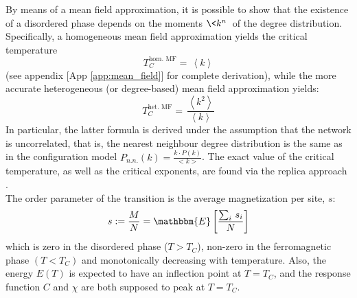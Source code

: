 By means of a mean field approximation, it is possible to show that the existence of a disordered phase depends on the moments $\<k^n\>$ of the degree distribution. Specifically, a homogeneous mean field approximation yields the critical temperature
\begin{equation} \label{eq:hom_mean_field}
    T_C^{\text{hom. MF}} =\,\left\langle k \right \rangle
\end{equation}
(see appendix [App \ref{app:mean_field}] for complete derivation), while the more accurate heterogeneous (or degree-based) mean field approximation yields:
\begin{equation} \label{eq:het_mean_field}
    T_C^{\text{het. MF}} =\,\frac{\left\langle k^2 \right \rangle}{\left\langle k \right \rangle}
\end{equation}
In particular, the latter formula is derived under the assumption that the network is uncorrelated, that is, the nearest neighbour degree distribution is the same as in the configuration model $P_{n.n.} (k)=\frac{k\cdot P(k)}{<k>}$.
The exact value of the critical temperature, as well as the critical exponents, are found via the replica approach \cite{analytical_ising}. \\ 
The order parameter of the transition is the average magnetization per site, $s$:
$$
s := \frac{M}{N} = \mathbbm{E}\left[\frac{\sum_{i}\,s_i}{N}\right]
$$
which is zero in the disordered phase ($T>T_C$), non-zero in the ferromagnetic  phase $(T<T_C)$ and monotonically decreasing with temperature. Also, the energy $E(T)$ is expected to have an inflection point at $T=T_C$, and the response function $C$ and $\chi$ are both supposed to peak at $T=T_C$.

